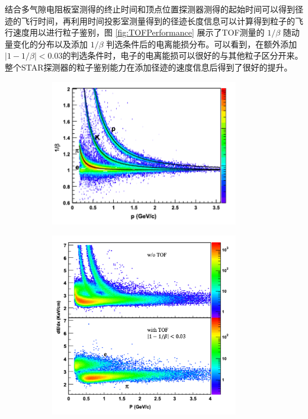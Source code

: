 结合多气隙电阻板室测得的终止时间和顶点位置探测器测得的起始时间可以得到径迹的飞行时间，再利用时间投影室测量得到的径迹长度信息可以计算得到粒子的飞行速度用以进行粒子鉴别，图 \ref{fig:TOFPerformance} 展示了TOF测量的 $1/\beta$ 随动量变化的分布以及添加 $1/\beta$ 判选条件后的电离能损分布。可以看到，在额外添加$|1-1/\beta| < 0.03$的判选条件时，电子的电离能损可以很好的与其他粒子区分开来。整个STAR探测器的粒子鉴别能力在添加径迹的速度信息后得到了很好的提升。

\begin{figure}[htb]
    \centering
    \begin{subfigure}[b]{0.47\textwidth}
        \centering
        \includegraphics[width=0.9\textwidth,clip]{figures/Chapter2/BetaDistribution.png}
        \caption{}
        \label{fig:BetaDis}
    \end{subfigure}
    \hfill
    \begin{subfigure}[b]{0.47\textwidth}
        \centering
        \includegraphics[width=0.9\textwidth,clip]{figures/Chapter2/dEdxwithTOF.png}

\end{subfigure}
\end{figure}
